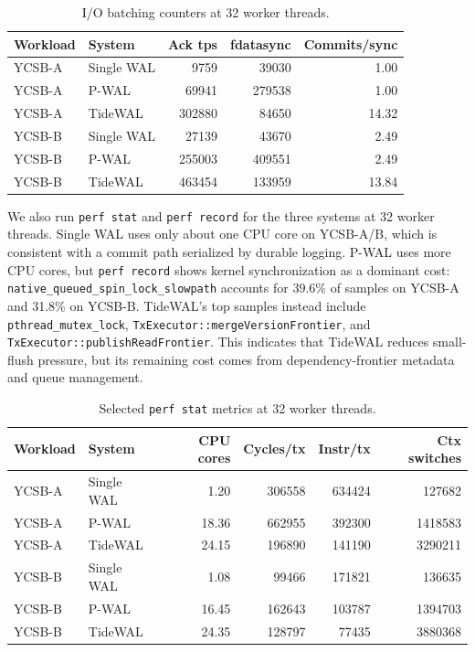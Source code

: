 \begin{table}[t]
  \centering
  \small
  \caption{I/O batching counters at 32 worker threads.}
  \label{tab:eval-io-batching}
  \begin{tabular}{llrrr}
    \hline
    Workload & System & Ack tps & fdatasync & Commits/sync \\
    \hline
    YCSB-A & Single WAL & 9759   & 39030  & 1.00 \\
    YCSB-A & P-WAL      & 69941  & 279538 & 1.00 \\
    YCSB-A & TideWAL    & 302880 & 84650  & 14.32 \\
    YCSB-B & Single WAL & 27139  & 43670  & 2.49 \\
    YCSB-B & P-WAL      & 255003 & 409551 & 2.49 \\
    YCSB-B & TideWAL    & 463454 & 133959 & 13.84 \\
    \hline
  \end{tabular}
\end{table}

We also run \texttt{perf stat} and \texttt{perf record} for the three systems at
32 worker threads.  Single WAL uses only about one CPU core on YCSB-A/B, which
is consistent with a commit path serialized by durable logging.  P-WAL uses more
CPU cores, but \texttt{perf record} shows kernel synchronization as a dominant
cost: \texttt{native\_queued\_spin\_lock\_slowpath} accounts for 39.6\% of
samples on YCSB-A and 31.8\% on YCSB-B.  TideWAL's top samples instead include
\texttt{pthread\_mutex\_lock}, \texttt{TxExecutor::mergeVersionFrontier}, and
\texttt{TxExecutor::publishReadFrontier}.  This indicates that TideWAL reduces
small-flush pressure, but its remaining cost comes from dependency-frontier
metadata and queue management.

\begin{table}[t]
  \centering
  \small
  \caption{Selected \texttt{perf stat} metrics at 32 worker threads.}
  \label{tab:eval-perf-stat}
  \begin{tabular}{llrrrr}
    \hline
    Workload & System & CPU cores & Cycles/tx & Instr/tx & Ctx switches \\
    \hline
    YCSB-A & Single WAL & 1.20  & 306558 & 634424 & 127682 \\
    YCSB-A & P-WAL      & 18.36 & 662955 & 392300 & 1418583 \\
    YCSB-A & TideWAL    & 24.15 & 196890 & 141190 & 3290211 \\
    YCSB-B & Single WAL & 1.08  & 99466  & 171821 & 136635 \\
    YCSB-B & P-WAL      & 16.45 & 162643 & 103787 & 1394703 \\
    YCSB-B & TideWAL    & 24.35 & 128797 & 77435  & 3880368 \\
    \hline
  \end{tabular}
\end{table}

